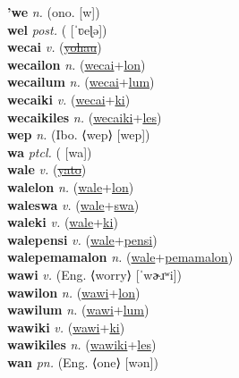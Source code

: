 \textbf{'we} \textit{n.} (ono. [w])
 \label{'we} \\
\textbf{wel} \textit{post.} ( [ˈʋeɭə])
 \label{wel} \\
\textbf{wecai} \textit{v.} (\hyperref[yohau]{\sout{yohau}})
 \label{wecai} \\
\textbf{wecailon} \textit{n.} (\hyperref[wecai]{wecai}+\hyperref[lon]{lon})
 \label{wecailon} \\
\textbf{wecailum} \textit{n.} (\hyperref[wecai]{wecai}+\hyperref[lum]{lum})
 \label{wecailum} \\
\textbf{wecaiki} \textit{v.} (\hyperref[wecai]{wecai}+\hyperref[ki]{ki})
 \label{wecaiki} \\
\textbf{wecaikiles} \textit{n.} (\hyperref[wecaiki]{wecaiki}+\hyperref[les]{les})
 \label{wecaikiles} \\
\textbf{wep} \textit{n.} (Ibo. ⟨wep⟩ [wep])
 \label{wep} \\
\textbf{wa} \textit{ptcl.} ( [wa])
 \label{wa} \\
\textbf{wale} \textit{v.} (\hyperref[yato]{\sout{yato}})
 \label{wale} \\
\textbf{walelon} \textit{n.} (\hyperref[wale]{wale}+\hyperref[lon]{lon})
 \label{walelon} \\
\textbf{waleswa} \textit{v.} (\hyperref[wale]{wale}+\hyperref[swa]{swa})
 \label{waleswa} \\
\textbf{waleki} \textit{v.} (\hyperref[wale]{wale}+\hyperref[ki]{ki})
 \label{waleki} \\
\textbf{walepensi} \textit{v.} (\hyperref[wale]{wale}+\hyperref[pensi]{pensi})
 \label{walepensi} \\
\textbf{walepemamalon} \textit{n.} (\hyperref[wale]{wale}+\hyperref[pemamalon]{pemamalon})
 \label{walepemamalon} \\
\textbf{wawi} \textit{v.} (Eng. ⟨worry⟩ [ˈwɚɹʷi])
 \label{wawi} \\
\textbf{wawilon} \textit{n.} (\hyperref[wawi]{wawi}+\hyperref[lon]{lon})
 \label{wawilon} \\
\textbf{wawilum} \textit{n.} (\hyperref[wawi]{wawi}+\hyperref[lum]{lum})
 \label{wawilum} \\
\textbf{wawiki} \textit{v.} (\hyperref[wawi]{wawi}+\hyperref[ki]{ki})
 \label{wawiki} \\
\textbf{wawikiles} \textit{n.} (\hyperref[wawiki]{wawiki}+\hyperref[les]{les})
 \label{wawikiles} \\
\textbf{wan} \textit{pn.} (Eng. ⟨one⟩ [wən])
 \label{wan} \\
